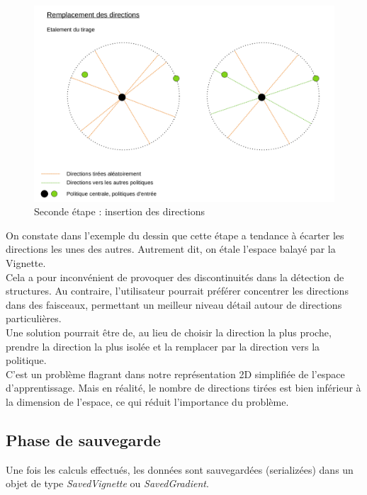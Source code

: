 \documentclass[12pt]{article}
\begin{document}
\begin{figure}[htp]
    \centering
    \includegraphics[width=15cm]{Images/vignette_portee2}
    \caption{Seconde étape : insertion des directions}
    \label{fig:vignettePortee}
\end{figure}

On constate dans l'exemple du dessin que cette étape a tendance à écarter les directions les unes des autres. Autrement dit, on étale l'espace balayé par la Vignette. \\

Cela a pour inconvénient de provoquer des discontinuités dans la détection de structures. Au contraire, l'utilisateur pourrait préférer concentrer les directions dans des faisceaux, permettant un meilleur niveau détail autour de directions particulières. \\

Une solution pourrait être de, au lieu de choisir la direction la plus proche, prendre la direction la plus isolée et la remplacer par la direction vers la politique. \\

C'est un problème flagrant dans notre représentation 2D simplifiée de l'espace d'apprentissage. Mais en réalité, le nombre de directions tirées est bien inférieur à la dimension de l'espace, ce qui réduit l'importance du problème. \\

\subsection{Phase de sauvegarde}

Une fois les calculs effectués, les données sont sauvegardées (serializées) dans un objet de type \emph{SavedVignette} ou \emph{SavedGradient}. \\
\end{document}
